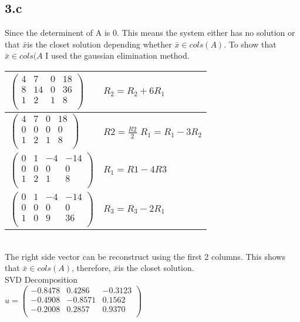 \documentclass{article}
\begin{document}
\subsection*{3.c}
Since the determinent of A is 0. This means the system either has no solution or that $\bar{x}$is the closet solution depending whether $\bar{x} \in cols(A)$. To show that $\bar{x} \in cols(A$ I used the gaussian elimination method. \\
\begin{tabular}{l|p{7cm}}
\hline
$\left(
\begin{array}{rrr|r}
   4 &  7  &  0 & 18\\
   8 &  14 &  0 & 36\\
   1  & 2 &  1 & 8\\
\end{array}
\right) $
&
$R_2 = R_2 + 6R_1$ \\
\hline
$\left (
\begin{array}{rrr|r}
   4 &  7  &  0 & 18\\
   0 &  0 &  0 & 0\\
   1  & 2 &  1 & 8\\
\end{array}  \right )$
&
$R2 = \frac{R2}{2}$ \newline
$R_1 = R_1 - 3R_2$ \\
\hline
$\left (
\begin{array}{rrr|r}
   0 &  1  &  -4 & -14\\
   0 &  0 &  0 & 0\\
   1  & 2 &  1 & 8\\
\end{array}  \right )$
&
$R_1 = R1 - 4R3$ \\
\hline
$\left (
\begin{array}{rrr|r}
   0 &  1  &  -4 & -14\\
   0 &  0 &  0 & 0\\
   1  & 0 &  9 & 36\\
\end{array}  \right )$
&
$R_3 = R_3 - 2R_1$ \\
\end{tabular} \\
The right side vector can be reconstruct using the first 2 columns. This shows that $\bar{x} \in cols(A)$, therefore, $\bar{x}$is the closet solution.\\
SVD Decomposition\\
$u =
\begin{pmatrix}
   -0.8478  &  0.4286  & -0.3123\\
   -0.4908  & -0.8571  &  0.1562\\
   -0.2008  &  0.2857  &  0.9370\\
\end{pmatrix}$\\
\end{document}
